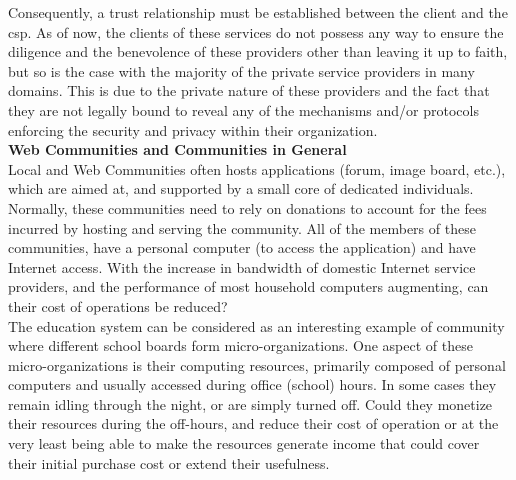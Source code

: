 \documentclass[12pt, titlepage]{uo_temp}
\begin{document}
     Consequently, a trust relationship must be established between the client and the
     \gls{csp}. As of now, the clients of these services do not possess any way to ensure
     the diligence and the benevolence of these providers other than leaving it up to
     faith, but so is the case with the majority of the private service providers in many
     domains. This is due to the private nature of these providers and the fact that they
     are not legally bound to reveal any of the mechanisms and/or protocols enforcing the
     security and privacy within their organization. \\


     \textbf{Web Communities and Communities in General}\\ 
     Local and Web Communities often hosts applications (forum, image board, etc.),
     which are aimed at, and supported by a small core of dedicated individuals. 
     Normally, these communities need to rely on donations to account for the fees
     incurred by hosting and serving the community.
     All of the members of these communities, have a personal computer (to access the
     application) and have Internet access.
     With the increase in bandwidth of domestic Internet service providers, and the
     performance of most household computers augmenting, can their cost of
     operations be reduced?  \\
     
     The education system can be considered as an interesting example of community where
     different school boards form micro-organizations. 
     One aspect of these micro-organizations is their computing resources,
     primarily composed of personal computers and usually accessed during office (school)
     hours. In some cases they remain idling through the night, or are simply turned off.
     Could they monetize their resources during the off-hours, and reduce
     their cost of operation or at the very least being able to make the resources
     generate income that could cover their initial purchase cost or extend their usefulness. \\
\end{document}
